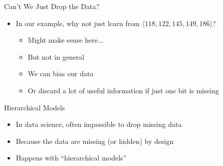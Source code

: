\documentclass[aspectratio=169]{beamer}
\begin{document}
\begin{frame}{Can't We Just Drop the Data?}

\begin{itemize}
\item In our example, why not just learn from $\langle 118, 122, 145, 149, 186 \rangle$?
	\begin{itemize}
	\item Might make sense here...
	\item But not in general
	\item We can bias our data
	\item Or discard a lot of useful information if just one bit is missing
	\end{itemize}
\end{itemize}
\end{frame}
\begin{frame}{Hierarchical Models}

\begin{itemize}
\item In data science, often impossible to drop missing data
\item Because the data are missing (or hidden) by design
\item Happens with ``hierarchical models''
\end{itemize}
\end{frame}
\end{document}
